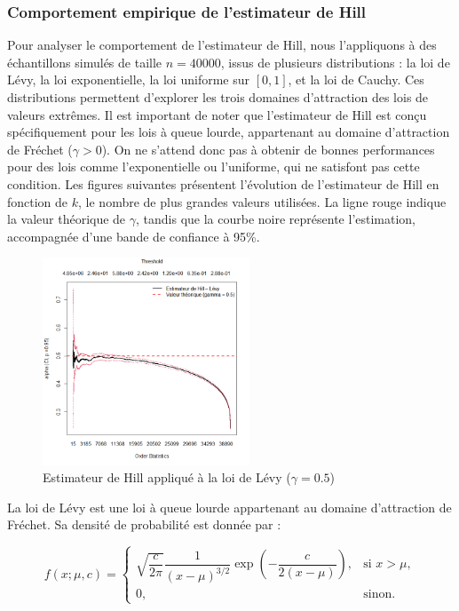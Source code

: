 \documentclass{article}
\theoremstyle{plain}
\theoremstyle{definition}
\theoremstyle{plain}
\begin{document}
\subsubsection{Comportement empirique de l’estimateur de Hill}
Pour analyser le comportement de l’estimateur de Hill, nous l’appliquons à des échantillons simulés de taille \(n = 40000\), issus de plusieurs distributions : la loi de Lévy, la loi exponentielle, la loi uniforme sur \([0,1]\), et la loi de Cauchy. Ces distributions permettent d’explorer les trois domaines d’attraction des lois de valeurs extrêmes.
Il est important de noter que l’estimateur de Hill est conçu spécifiquement pour les lois à queue lourde, appartenant au domaine d’attraction de Fréchet (\(\gamma > 0\)). On ne s’attend donc pas à obtenir de bonnes performances pour des lois comme l’exponentielle ou l’uniforme, qui ne satisfont pas cette condition.
Les figures suivantes présentent l’évolution de l’estimateur de Hill en fonction de \(k\), le nombre de plus grandes valeurs utilisées. La ligne rouge indique la valeur théorique de \(\gamma\), tandis que la courbe noire représente l’estimation, accompagnée d’une bande de confiance à 95\%.
\begin{figure}[H]
    \centering
    \includegraphics[width=0.55\textwidth]{./Evolution des estimateurs/hill/estimateur_hill_levy.png}
    \caption{Estimateur de Hill appliqué à la loi de Lévy ($\gamma = 0.5$)}
\end{figure}
La loi de Lévy est une loi à queue lourde appartenant au domaine d’attraction de Fréchet. Sa densité de probabilité est donnée par :

\[
f(x; \mu, c) =
\begin{cases}
\sqrt{\dfrac{c}{2\pi}} \dfrac{1}{(x - \mu)^{3/2}} \exp\left(-\dfrac{c}{2(x - \mu)}\right), & \text{si } x > \mu, \\
0, & \text{sinon.}
\end{cases}
\]
\end{document}
